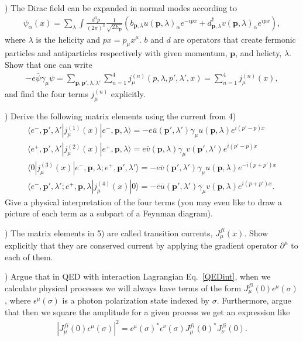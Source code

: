 \documentclass[working, oneside]{../../../Preambles/tuftebook}
\begin{document}
\vspace{1em}
) The Dirac field can be expanded in normal modes according to
\begin{align}
\psi_\alpha(x)=\sum_{\lambda}\int\frac{d^3p}{(2\pi)^3}\frac{1}{\sqrt{2E_{\bm p}}}\left(b_{\bm p,\lambda}u(\bm p,\lambda)_\alpha e^{-ipx}+
d_{\bm p,\lambda}^{\dagger}v(\bm p,\lambda)_\alpha e^{ipx}\right),
\label{expand}
\end{align}
where $\lambda$ is the helicity and $px=p_\mu x^\mu$. $b$ and $d$ are operators that 
create fermonic particles and antiparticles respectively with given momentum, $\bm p$, and 
helicty, $\lambda$. Show that one can write 
\begin{align}
-e\bar{\psi}\gamma_\mu\psi=\sum_{\bm p,\bm p',\lambda,\lambda'}\sum_{n=1}^{4} j_{\mu}^{(n)}\left(p,\lambda,p',\lambda',x\right)=
\sum_{n=1}^{4} j_{\mu}^{(n)}\left(x\right),
\end{align}
and find the four terms $j_{\mu}^{(n)}$ explicitly.

\vspace{1em}
) Derive the following matrix elements using the current from 4)
\begin{align}
&\langle e^-,\bm p',\lambda'| j_{\mu}^{(1)}(x)|e^-,\bm p,\lambda\rangle=-e\overline{u}(\bm p',\lambda')\gamma_\mu u(\bm p,\lambda)e^{i(p'-p)x}&\\
&\langle e^+,\bm p',\lambda'| j_{\mu}^{(2)}(x)|e^+,\bm p,\lambda\rangle=e\overline{v}(\bm p,\lambda)\gamma_\mu v(\bm p',\lambda')e^{i(p'-p)x}&\\
&\langle 0| j_{\mu}^{(3)}(x)|e^-,\bm p,\lambda;e^+,\bm p',\lambda'\rangle=-e\overline{v}(\bm p',\lambda')\gamma_\mu u(\bm p,\lambda)e^{-i(p+p')x}&\\
&\langle e^-,\bm p',\lambda';e^+,\bm p,\lambda| j_{\mu}^{(4)}(x)|0\rangle=-e\overline{u}(\bm p',\lambda')\gamma_\mu v(\bm p,\lambda)e^{i(p+p')x}.&
\end{align}
Give a physical interpretation of the four terms (you may even like to draw a picture of each term as a subpart of a Feynman diagram).

\vspace{1em} 
) The matrix elements in 5) are called transition currents, $J_{\mu}^{fi}(x)$. Show explicitly that they are conserved current by 
applying the gradient operator $\partial^\mu$ to each of them.

\vspace{1em}
) Argue that in QED with interaction Lagrangian Eq.~\eqref{QEDint}, when we calculate physical processes we 
will always have terms of the form $J_{\mu}^{fi}(0)\epsilon^{\mu}(\sigma)$, where $\epsilon^{\mu}(\sigma)$ is a 
photon polarization state indexed by $\sigma$. Furthermore, argue that then we square the amplitude for a given 
process we get an expression like 
\begin{align}
|J_{\mu}^{fi}(0)\epsilon^{\mu}(\sigma)|^2=\epsilon^{\mu}(\sigma)^*\epsilon^{\nu}(\sigma) 
J_{\mu}^{fi}(0)^*J_{\nu}^{fi}(0).
\end{align}
\end{document}
